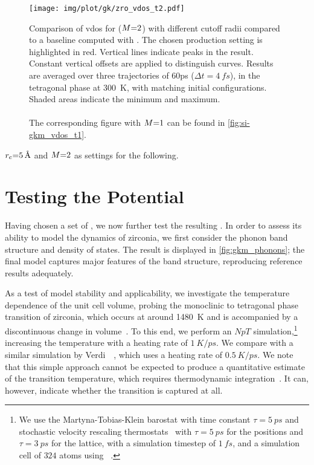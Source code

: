 \begin{figure}
  \texttt{[image: img/plot/gk/zro\_vdos\_t2.pdf]}
  \caption{
  Comparison of \gls{vdos} for \mpnns{} ($M{=}2$) with different cutoff radii compared to a baseline computed with \aims. The chosen production setting is highlighted in red.
  Vertical lines indicate peaks in the \aims result. Constant vertical offsets are applied to distinguish curves. Results are averaged over three trajectories of \si{60}{ps} ($\Delta t{=}\SI{4}{fs}$), in the tetragonal phase at \SI{300}{K}, with matching initial configurations. Shaded areas indicate the minimum and maximum.
  \\\\
  The corresponding figure with $M{=}1$ can be found in \cref{fig:si-gkm_vdos_t1}.
  }
  \label{fig:gkm_vdos}
\end{figure}


 $r_{\text{c}}{=}\SI{5}{\angstrom}$ and $M{=}2$ as  settings for the following.


\section{Testing the Potential}
\label{sec:gkm_limit}

Having chosen a set of \hps, we now further test the resulting \mlp.
In order to assess its ability to model the dynamics of zirconia, we first consider the phonon band structure and density of states. The result is displayed in \cref{fig:gkm_phonons}; the final model captures major features of the band structure, reproducing reference results adequately.

As a test of model stability and applicability, we investigate the temperature dependence of the unit cell volume, probing the monoclinic to tetragonal phase transition of zirconia, which occurs at around \qty{1480}{K} and is accompanied by a discontinuous change in volume~\cite{kh1998t}.
To this end, we perform an $NpT$ simulation,\footnote{We use the Martyna-Tobias-Klein barostat \cite{mtk1994p} with time constant $\tau{=}\qty{5}{ps}$ and stochastic velocity rescaling thermostats~\cite{bdp2007p} with $\tau{=}\qty{5}{ps}$ for the positions and $\tau{=}\qty{3}{ps}$ for the lattice, with a simulation timestep of $\qty{1}{fs}$, and a simulation cell of $324$ atoms using \ipi~\cite{ipi}.} increasing the temperature with a heating rate of $\qty{1}{K\per ps}$.
We compare with a similar simulation by Verdi~\etal{}~\cite{vkjk2021q}, which uses a heating rate of $\qty{0.5}{K\per ps}$.
We note that this simple approach cannot be expected to produce a quantitative estimate of the transition temperature, which requires thermodynamic integration~\cite{vkjk2021q}. It can, however, indicate whether the transition is captured at all.

